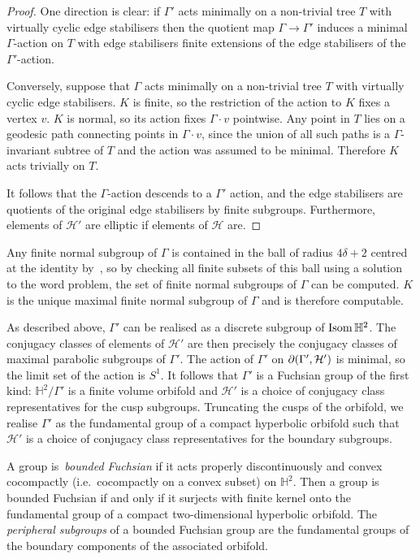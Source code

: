 \begin{proof} One direction is clear: if $\Gamma'$ acts minimally on a
non-trivial tree $T$ with virtually cyclic edge stabilisers then the quotient
map $\Gamma \to \Gamma'$ induces a minimal $\Gamma$-action on $T$ with
edge stabilisers finite extensions of the edge stabilisers of the
$\Gamma'$-action. 

Conversely, suppose that $\Gamma$ acts minimally on a non-trivial tree $T$ with
virtually cyclic edge stabilisers. $K$ is finite, so the restriction of the
action to $K$ fixes a vertex $v$. $K$ is normal, so its action fixes
$\Gamma\cdot v$ pointwise. Any point in $T$ lies on a geodesic path connecting
points in $\Gamma\cdot v$, since the union of all such paths is a
$\Gamma$-invariant subtree of $T$ and the action was assumed to be minimal.
Therefore $K$ acts trivially on $T$.

It follows that the $\Gamma$-action descends to a $\Gamma'$ action, and the
edge stabilisers are quotients of the original edge stabilisers by finite
subgroups.  Furthermore, elements of $\mathcal{H}'$ are elliptic if elements of
$\mathcal{H}$ are. \end{proof}

Any finite normal subgroup of $\Gamma$ is contained in the ball of radius
$4\delta + 2$ centred at the identity by~\cite{bridsonhaefliger99}, so by
checking all finite subsets of this ball using a solution to the word problem,
the set of finite normal subgroups of $\Gamma$ can be computed. $K$ is the
unique maximal finite normal subgroup of $\Gamma$ and is therefore computable. 

As described above, $\Gamma'$ can be realised as a discrete subgroup of
$\operatorname{\mathrm{Isom}}\mathbb{H}^2$. The conjugacy classes of elements of $\mathcal{H}'$ are
then precisely the conjugacy classes of maximal parabolic subgroups of
$\Gamma'$. The action of $\Gamma'$ on $\partial(\Gamma', \mathcal{H}')$ is
minimal, so the limit set of the action is $S^1$. It follows that $\Gamma'$ is
a Fuchsian group of the first kind: $\mathbb{H}^2/\Gamma'$ is a finite volume
orbifold and $\mathcal{H}'$ is a choice of conjugacy class representatives for
the cusp subgroups. Truncating the cusps of the orbifold, we realise $\Gamma'$
as the fundamental group of a compact hyperbolic orbifold such that
$\mathcal{H}'$ is a choice of conjugacy class representatives for the boundary
subgroups.  

\begin{defn}\label{defn:boundedFuchsian} A group is~\emph{bounded Fuchsian} if
it acts properly discontinuously and convex cocompactly (i.e.\ cocompactly on
a convex subset) on $\mathbb{H}^2$. Then a group is bounded Fuchsian if and
only if it surjects with finite kernel onto the fundamental group of a compact
two-dimensional hyperbolic orbifold. The \emph{peripheral
subgroups} of a bounded Fuchsian group are the fundamental groups of the
boundary components of the associated orbifold.\end{defn}

